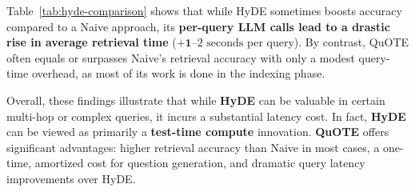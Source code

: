 Table~\ref{tab:hyde-comparison} shows that while HyDE sometimes boosts accuracy compared to a Naive approach, its {\bf per-query LLM calls lead to a drastic rise in average retrieval time} (\(\mathbf{+1}\text{--}2 \text{ seconds}\) per query). By contrast, QuOTE often equals or surpasses Naive’s retrieval accuracy with only a modest query-time overhead, as most of its work is done in the indexing phase.

\iffalse
\paragraph{Observations.}
\begin{itemize}
    \item \textbf{Speed vs.\ Accuracy:} HyDE can outperform Naive on multi-hop retrieval (23.50\% vs.\ 23.00\% full-match at \(k=20\)) but imposes a $\sim$5--6\,second query overhead (see MultiHop). By contrast, QuOTE is faster at query time and, for SQuAD, yields a large accuracy boost (90.03\% vs.\ 79.31\% Naive, 76.60\% HyDE).
    \item \textbf{Index-Time vs.\ Query-Time Generation:} QuOTE \emph{frontloads} question generation at index time—leading to a longer addition phase—but saves time during repeated queries, whereas HyDE regenerates text for every query.
    \item \textbf{Natural Questions Nuance:} In NQ, HyDE slightly surpasses Naive (75.24\% vs.\ 73.54\%), but QuOTE ends up near 74.20\%. Both HyDE and QuOTE remain beneficial for retrieving more relevant contexts than Naive alone.
\end{itemize}
\fi

Overall, these findings illustrate that while \textbf{HyDE} can be valuable in certain multi-hop or complex queries, it incurs a substantial latency cost. 
In fact, \textbf{HyDE} can be viewed as primarily a {\bf test-time compute} innovation.
\textbf{QuOTE} offers significant advantages: higher retrieval accuracy than Naive in most cases, a one-time, amortized cost for question generation, and dramatic query latency improvements over HyDE.


